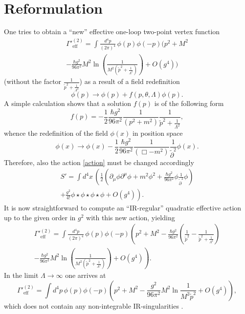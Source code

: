 \documentclass[a4paper,12pt]{article}
\begin{document}
\section{Reformulation} \label{refo}
One tries to obtain a ``new'' effective one-loop two-point vertex function 
\begin{multline}
  {\Gamma'}^{(2)}_{\mathrm{eff}} = \int \frac{d^4 \! p}{(2 \pi)^4} \, \phi(p) 
    \phi(-p) \Bigg( p^2 
      + M^2  \\
    - \frac{\hbar g^2}{96 \pi^2} M^2 \ln \left( \frac{1}{M^2 
      (\tilde{p}^2 + \frac{1}{\Lambda^2})} \right) + O(g^4) \Bigg)
\end{multline}
(without the factor $\tfrac{1}{\tilde{p}^2 + \tfrac{1}{\Lambda^2}}$) as a result of a field redefinition
\begin{equation}
  \phi(p) \rightarrow \phi(p) + f(p, \theta, \Lambda) \phi(p).
\end{equation}
A simple calculation shows that a solution $f(p)$ is of the following form
\begin{equation}
  f(p) = -\frac{1}{2} \frac{\hbar g^2}{96 \pi^2} \frac{1}{(p^2 + m^2)} 
   \frac{1}{\tilde{p}^2 + \frac{1}{\Lambda^2}},
\end{equation}
whence the redefinition of the field $\phi(x)$ in position space
\begin{equation}
  \label{xredef}
  \phi(x) \rightarrow \phi(x) - \frac{1}{2} \frac{\hbar g^2}{96 \pi^2} 
    \frac{1}{(\Box - m^2)}\frac{1}{\tilde{\partial}^2} \phi(x).
\end{equation}
Therefore, also the action \eqref{action} must be changed accordingly
\begin{multline}
  \label{sredef}
  S' = \int d^4 \! x \, \left( \frac{1}{2} \left( \partial_\mu \phi 
    \partial^\mu \phi + m^2 \phi^2 + \frac{\hbar g^2}{96 \pi^2} \phi 
      \frac{1}{\tilde{\partial}^2} \phi \right)  \right.\\ 
    + \left. \frac{g^2}{4!} \phi \star \phi \star \phi \star \phi + O(g^4) 
      \right).
\end{multline}
It is now straightforward to compute an ``IR-regular'' quadratic effective action up to the given order in $g^2$ with this new action, yielding
\begin{multline}
  {\Gamma'}^{{(2)}}_{\mathrm{eff}} = \int \frac{d^4 \! p}{(2 \pi)^4} \, 
    \phi(p) \phi(-p) 
      \left(p^2 + M^2 - \frac{\hbar g^2}{96 \pi^2} \left( \frac{1}
        {\tilde{p}^2} 
          - \frac{1}{\tilde{p}^2 + \frac{1}{\Lambda^2}} \right) \right.  \\ 
    - \left. \frac{\hbar g^2}{96 \pi^2} M^2 \ln \left(\frac{1}{M^2 ( 
      \tilde{p}^2 + \frac{1}{\Lambda^2} )} \right) + O(g^4) \right).
\end{multline}
In the limit $\Lambda \rightarrow \infty$ one arrives at
\begin{equation}
  {\Gamma'}^{{(2)}}_{\mathrm{eff}} = \int d^4 \! p \, \phi(p) \phi(-p) 
    \left(p^2 + M^2 - \frac{g^2}{96 \pi^2} M^2 \ln \frac{1}{M^2 \tilde{p}^2} 
      + O(g^4) \right),
\end{equation}
which does not contain any non-integrable IR-singularities \cite{Grosse:2000yy}.
\end{document}
